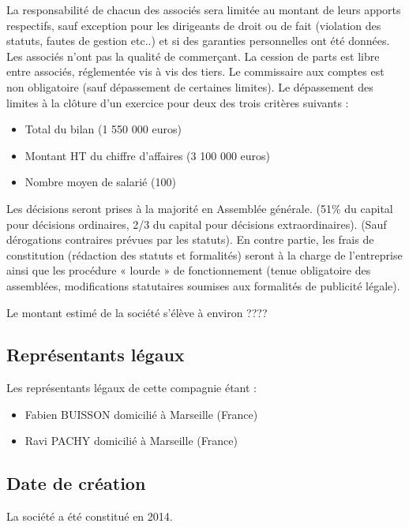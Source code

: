 \documentclass[10pt]{article}
\begin{document}
La responsabilité de chacun des associés sera limitée au montant de leurs apports respectifs, sauf exception pour les dirigeants de droit ou de fait (violation des statuts, fautes de gestion etc..) et si des garanties personnelles ont été données.
Les associés n'ont pas la qualité de commerçant.
La cession de parts est libre entre associés, réglementée vis à vis des tiers.
Le commissaire aux comptes est non obligatoire (sauf dépassement de certaines limites). Le dépassement des limites à la clôture d'un exercice pour deux des trois critères suivants :
\begin{itemize}
	\item Total du bilan (1 550 000 euros) 
	\item Montant HT du chiffre d'affaires (3 100 000 euros)
	\item Nombre moyen de salarié (100)
\end{itemize}

Les décisions seront prises à la majorité en Assemblée générale. (51\% du capital pour décisions ordinaires, 2/3 du capital pour décisions extraordinaires). (Sauf dérogations contraires prévues par les statuts). En contre partie, les frais de constitution (rédaction des statuts et formalités) seront à la charge de l'entreprise ainsi que les procédure « lourde » de fonctionnement (tenue obligatoire des assemblées, modifications statutaires soumises aux formalités de publicité légale).

Le montant estimé de la société s'élève à environ ????%
\subsection{Représentants légaux}
\label{sub:representants}

Les représentants légaux de cette compagnie étant :
\begin{itemize}
	\item Fabien BUISSON domicilié à Marseille (France)
	\item Ravi PACHY domicilié à Marseille (France)
\end{itemize}


\subsection{Date de création}
\label{sub:date_creation}
La société a été constitué en 2014.
\end{document}
